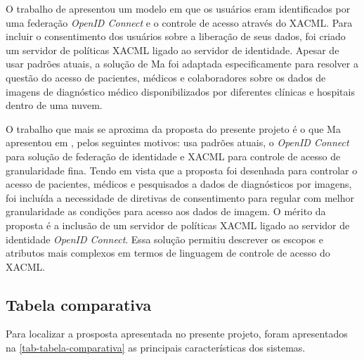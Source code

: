 \documentclass{doublecol-new}
\begin{document}
O trabalho de \cite{ma2015cloud} apresentou um modelo em que os usuários eram identificados por uma federação \textit{OpenID Connect} e o controle de acesso através do XACML. Para incluir o consentimento dos usuários sobre a liberação de seus dados, foi criado um servidor de políticas XACML ligado ao servidor de identidade. Apesar de usar padrões atuais, a solução de Ma foi adaptada especificamente para resolver a questão do acesso de pacientes, médicos e colaboradores sobre os dados de imagens de diagnóstico médico disponibilizados por diferentes clínicas e hospitais dentro de uma nuvem.

O trabalho que mais se aproxima da proposta do presente projeto é o que Ma apresentou em \cite{ma2015cloud}, pelos seguintes motivos: usa padrões atuais, o \textit{OpenID Connect} para solução de federação de identidade e XACML para controle de acesso de granularidade fina. Tendo em vista que a proposta foi desenhada para controlar o acesso de pacientes, médicos e pesquisados a dados de diagnósticos por imagens, foi incluída a necessidade de diretivas de consentimento para regular com melhor granularidade as condições para acesso aos dados de imagem. O mérito da proposta é a inclusão de um servidor de políticas XACML ligado ao servidor de identidade \textit{OpenID Connect}. Essa solução permitiu descrever os escopos e atributos mais complexos em termos de linguagem de controle de acesso do XACML.






\subsection{Tabela comparativa}

Para localizar a prosposta apresentada no presente projeto, foram apresentados na \ref{tab-tabela-comparativa} as principais características dos sistemas.
\end{document}
